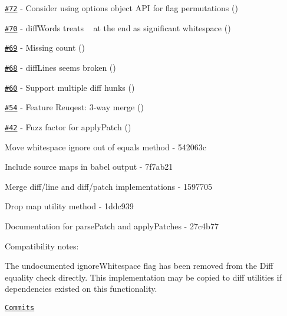 \begin{DoxyItemize}
\item \href{https://github.com/kpdecker/jsdiff/issues/72}{\tt \#72} -\/ Consider using options object A\+PI for flag permutations (\href{https://api.github.com/users/kpdecker}{\tt })
\item \href{https://github.com/kpdecker/jsdiff/issues/70}{\tt \#70} -\/ diff\+Words treats ~\newline
 at the end as significant whitespace (\href{https://api.github.com/users/nesQuick}{\tt })
\item \href{https://github.com/kpdecker/jsdiff/issues/69}{\tt \#69} -\/ Missing count (\href{https://api.github.com/users/wfalkwallace}{\tt })
\item \href{https://github.com/kpdecker/jsdiff/issues/68}{\tt \#68} -\/ diff\+Lines seems broken (\href{https://api.github.com/users/wfalkwallace}{\tt })
\item \href{https://github.com/kpdecker/jsdiff/issues/60}{\tt \#60} -\/ Support multiple diff hunks (\href{https://api.github.com/users/piranna}{\tt })
\item \href{https://github.com/kpdecker/jsdiff/issues/54}{\tt \#54} -\/ Feature Reuqest\+: 3-\/way merge (\href{https://api.github.com/users/mog422}{\tt })
\item \href{https://github.com/kpdecker/jsdiff/issues/42}{\tt \#42} -\/ Fuzz factor for apply\+Patch (\href{https://api.github.com/users/stuartpb}{\tt })
\item Move whitespace ignore out of equals method -\/ 542063c
\item Include source maps in babel output -\/ 7f7ab21
\item Merge diff/line and diff/patch implementations -\/ 1597705
\item Drop map utility method -\/ 1ddc939
\item Documentation for parse\+Patch and apply\+Patches -\/ 27c4b77
\end{DoxyItemize}

Compatibility notes\+:
\begin{DoxyItemize}
\item The undocumented ignore\+Whitespace flag has been removed from the Diff equality check directly. This implementation may be copied to diff utilities if dependencies existed on this functionality.
\end{DoxyItemize}

\href{https://github.com/kpdecker/jsdiff/compare/v2.0.2...v2.1.0}{\tt Commits}

